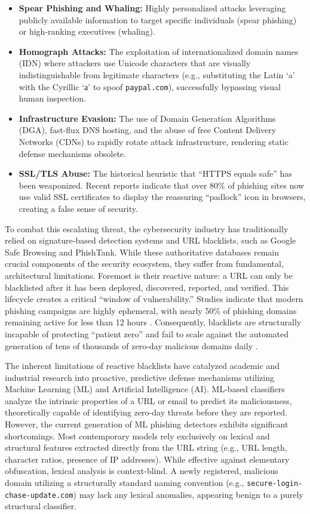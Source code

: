 \begin{itemize}
\item
  \textbf{Spear Phishing and Whaling:} Highly personalized attacks
  leveraging publicly available information to target specific
  individuals (spear phishing) or high-ranking executives (whaling).
\item
  \textbf{Homograph Attacks:} The exploitation of internationalized
  domain names (IDN) where attackers use Unicode characters that are
  visually indistinguishable from legitimate characters (e.g.,
  substituting the Latin `a' with the Cyrillic `а' to spoof
  \texttt{paypal.com}), successfully bypassing visual human inspection.
\item
  \textbf{Infrastructure Evasion:} The use of Domain Generation
  Algorithms (DGA), fast-flux DNS hosting, and the abuse of free Content
  Delivery Networks (CDNs) to rapidly rotate attack infrastructure,
  rendering static defense mechanisms obsolete.
\item
  \textbf{SSL/TLS Abuse:} The historical heuristic that ``HTTPS equals
  safe'' has been weaponized. Recent reports indicate that over 80\% of
  phishing sites now use valid SSL certificates to display the
  reassuring ``padlock'' icon in browsers, creating a false sense of
  security.
\end{itemize}

To combat this escalating threat, the cybersecurity industry has
traditionally relied on signature-based detection systems and URL
blacklists, such as Google Safe Browsing and PhishTank. While these
authoritative databases remain crucial components of the security
ecosystem, they suffer from fundamental, architectural limitations.
Foremost is their reactive nature: a URL can only be blacklisted after
it has been deployed, discovered, reported, and verified. This lifecycle
creates a critical ``window of vulnerability.'' Studies indicate that
modern phishing campaigns are highly ephemeral, with nearly 50\% of
phishing domains remaining active for less than 12 hours \cite{ramesh2015}.
Consequently, blacklists are structurally incapable of protecting
``patient zero'' and fail to scale against the automated generation of
tens of thousands of zero-day malicious domains daily \cite{webroot2023}.

The inherent limitations of reactive blacklists have catalyzed academic
and industrial research into proactive, predictive defense mechanisms
utilizing Machine Learning (ML) and Artificial Intelligence (AI).
ML-based classifiers analyze the intrinsic properties of a URL or email
to predict its maliciousness, theoretically capable of identifying
zero-day threats before they are reported. However, the current
generation of ML phishing detectors exhibits significant shortcomings.
Most contemporary models rely exclusively on lexical and structural
features extracted directly from the URL string (e.g., URL length,
character ratios, presence of IP addresses). While effective against
elementary obfuscation, lexical analysis is context-blind. A newly
registered, malicious domain utilizing a structurally standard naming
convention (e.g., \texttt{secure-login-chase-update.com}) may lack any
lexical anomalies, appearing benign to a purely structural classifier.

